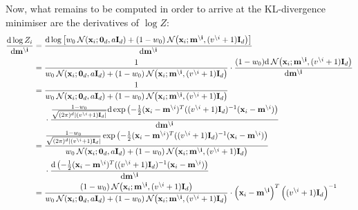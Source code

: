 \documentclass[11pt]{article}
\newcommand{\vek}[1]{\ensuremath{\mathbf{#1}}}
\newcommand{\byd}{\ensuremath{\mathrm{d}}}
\newcommand{\norm}{\ensuremath{\:\mathcal{N}}}
\newcommand{\unity}{\ensuremath{\mathbf{I}}}
\begin{document}
\bigskip
Now, what remains to be computed in order to arrive at the KL-divergence 
minimiser are the derivatives of $\log Z$:
\begin{align}
\frac{\byd \log Z_i}{\byd \vek{m^{\setminus i}}} &=
			\frac{\byd \log\left[ w_0  \norm(\vek{x}_i; \vek{0}_d, a\unity_{d})
			+  (1 - w_0)\norm\!\left(\vek{x}_i; \vek{m^{\setminus i}}, (v^{\setminus i} 
			+ 1)\unity_{d}\right)
			\right]}{\byd \vek{m^{\setminus i}}} \\
			&=
			\frac{1}{w_0  \norm(\vek{x}_i; \vek{0}_d, a\unity_{d})
			+  (1 - w_0)\norm\!\left(\vek{x}_i; \vek{m^{\setminus i}}, (v^{\setminus i} 
			+ 1)\unity_{d}\right)
			}\cdot
			\frac{(1 - w_0)\byd
			\norm\!\left(\vek{x}_i; \vek{m^{\setminus i}}, (v^{\setminus i} 
			+ 1)\unity_{d}\right)
			}{\byd \vek{m^{\setminus i}}} \\
			&=
			\frac{1}{w_0  \norm(\vek{x}_i; \vek{0}_d, a\unity_{d})
			+  (1 - w_0)\norm\!\left(\vek{x}_i; \vek{m^{\setminus i}}, (v^{\setminus i} 
			+ 1)\unity_{d}\right)
			}\notag\\
		&\hphantom{=|}\mbox{}
			\cdot
			\frac{
				\frac{1 - w_0}
				{\sqrt{(2\pi)^d|(v^{\setminus i} + 1)\unity_d|}}
			\byd
			\exp\left(-\frac{1}{2}
				(\vek{x}_i - \vek{m}^{\setminus i})^T
				((v^{\setminus i} + 1)\unity_d)^{-1}
				(\vek{x}_i - \vek{m}^{\setminus i})\right)}{\byd \vek{m^{\setminus i}}} \\
			&=
			\frac{\frac{1 - w_0}
				{\sqrt{(2\pi)^d|(v^{\setminus i} + 1)\unity_d|}}
			\exp\left(-\frac{1}{2}
				(\vek{x}_i - \vek{m}^{\setminus i})^T
				((v^{\setminus i} + 1)\unity_d)^{-1}
				(\vek{x}_i - \vek{m}^{\setminus i})\right)
				}
			{w_0  \norm(\vek{x}_i; \vek{0}_d, a\unity_{d})
			+  (1 - w_0)\norm\!\left(\vek{x}_i; \vek{m^{\setminus i}}, (v^{\setminus i} 
			+ 1)\unity_{d}\right)
			}\notag\\
		&\hphantom{=|}\mbox{}
			\cdot
			\frac{
			\byd
			\left(-\frac{1}{2}
				(\vek{x}_i - \vek{m}^{\setminus i})^T
				((v^{\setminus i} + 1)\unity_d)^{-1}
				(\vek{x}_i - \vek{m}^{\setminus i})\right)}{\byd \vek{m^{\setminus i}}} \\
			&=
			\frac{(1 - w_0)
				\norm\!\left(\vek{x}_i; \vek{m^{\setminus i}}, (v^{\setminus i} 
							+ 1)\unity_{d}\right)
				}
			{w_0  \norm(\vek{x}_i; \vek{0}_d, a\unity_{d})
			+  (1 - w_0)\norm\!\left(\vek{x}_i; \vek{m^{\setminus i}}, (v^{\setminus i} 
			+ 1)\unity_{d}\right)
			}
			\cdot
			\left(\vek{x}_i - \vek{m^{\setminus i}}\right)^T
			\left((v^{\setminus i} + 1)\unity_d\right)^{-1}
\end{align}
\end{document}
